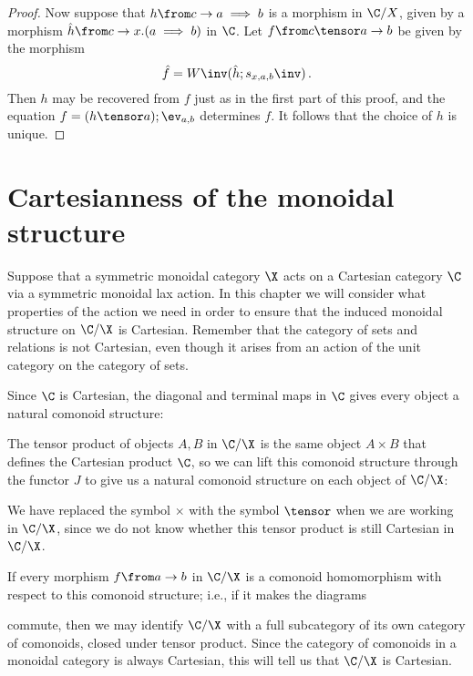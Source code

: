 \begin{proof}
  Now suppose that $h\from c \to a\implies b$ is a morphism in $\C/X$, given by a morphism $\hat{h} \from c \to x.(a\implies b)$ in $\C$.
  Let $f \from c \tensor a \to b$ be given by the morphism
  \[
    \hat{f} = W\inv(\hat{h};s_{x,a,b}\inv)\,.
    \]
  Then $h$ may be recovered from $f$ just as in the first part of this proof, and the equation $f = (h\tensor a);\ev_{a,b}$ determines $f$.  
  It follows that the choice of $h$ is unique.
\end{proof}

\section{Cartesianness of the monoidal structure}

Suppose that a symmetric monoidal category $\X$ acts on a Cartesian category $\C$ via a symmetric monoidal lax action.
In this chapter we will consider what properties of the action we need in order to ensure that the induced monoidal structure on $\C/\X$ is Cartesian.
Remember that the category of sets and relations is not Cartesian, even though it arises from an action of the unit category on the category of sets.

Since $\C$ is Cartesian, the diagonal and terminal maps in $\C$ gives every object a natural comonoid structure:
The tensor product of objects $A,B$ in $\C/\X$ is the same object $A\times B$ that defines the Cartesian product $\C$, so we can lift this comonoid structure through the functor $J$ to give us a natural comonoid structure on each object of $\C/\X$:
We have replaced the symbol $\times$ with the symbol $\tensor$ when we are working in $\C/\X$, since we do not know whether this tensor product is still Cartesian in $\C/\X$.

If every morphism $f\from a \to b$ in $\C/\X$ is a comonoid homomorphism with respect to this comonoid structure; i.e., if it makes the diagrams
commute, then we may identify $\C/\X$ with a full subcategory of its own category of comonoids, closed under tensor product.  
Since the category of comonoids in a monoidal category is always Cartesian, this will tell us that $\C/\X$ is Cartesian.  

